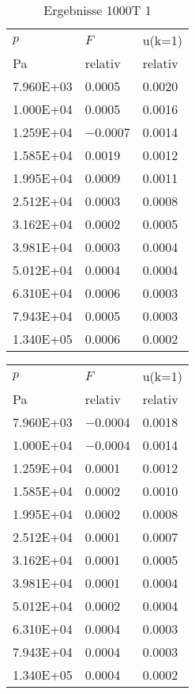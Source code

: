 \begin{table}\begin{tabular}{l l l }
\toprule
$p$&$F$&u(k=1)\\
 Pa & relativ & relativ\\\midrule
\num{7.960E+03}&\num{0.0005}&\num{0.0020}\\
\num{1.000E+04}&\num{0.0005}&\num{0.0016}\\
\num{1.259E+04}&\num{-0.0007}&\num{0.0014}\\
\num{1.585E+04}&\num{0.0019}&\num{0.0012}\\
\num{1.995E+04}&\num{0.0009}&\num{0.0011}\\
\num{2.512E+04}&\num{0.0003}&\num{0.0008}\\
\num{3.162E+04}&\num{0.0002}&\num{0.0005}\\
\num{3.981E+04}&\num{0.0003}&\num{0.0004}\\
\num{5.012E+04}&\num{0.0004}&\num{0.0004}\\
\num{6.310E+04}&\num{0.0006}&\num{0.0003}\\
\num{7.943E+04}&\num{0.0005}&\num{0.0003}\\
\num{1.340E+05}&\num{0.0006}&\num{0.0002}\\
\bottomrule
\end{tabular}\caption{Ergebnisse 1000T 1}\end{table}\begin{table}\begin{tabular}{l l l }
\toprule
$p$&$F$&u(k=1)\\
 Pa & relativ & relativ\\\midrule
\num{7.960E+03}&\num{-0.0004}&\num{0.0018}\\
\num{1.000E+04}&\num{-0.0004}&\num{0.0014}\\
\num{1.259E+04}&\num{0.0001}&\num{0.0012}\\
\num{1.585E+04}&\num{0.0002}&\num{0.0010}\\
\num{1.995E+04}&\num{0.0002}&\num{0.0008}\\
\num{2.512E+04}&\num{0.0001}&\num{0.0007}\\
\num{3.162E+04}&\num{0.0001}&\num{0.0005}\\
\num{3.981E+04}&\num{0.0001}&\num{0.0004}\\
\num{5.012E+04}&\num{0.0002}&\num{0.0004}\\
\num{6.310E+04}&\num{0.0004}&\num{0.0003}\\
\num{7.943E+04}&\num{0.0004}&\num{0.0003}\\
\num{1.340E+05}&\num{0.0004}&\num{0.0002}\\

\end{tabular}
\end{table}
